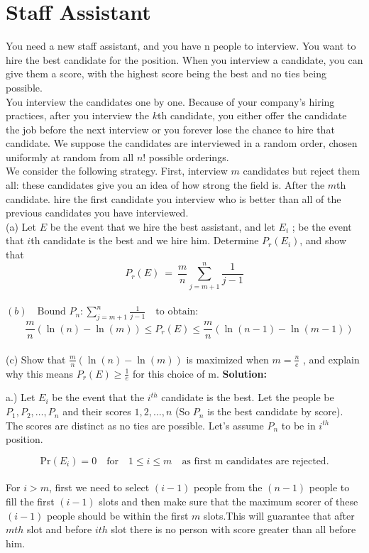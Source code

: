 \documentclass[12pt]{article}
\begin{document}
\newpage

\section{Staff Assistant}
You need a new staff assistant, and you have n people to interview. You want to hire the best
candidate for the position. When you interview a candidate, you can give them a score, with the
highest score being the best and no ties being possible.\\
You interview the candidates one by one. Because of your company’s hiring practices, after
you interview the $k$th candidate, you either offer the candidate the job before the next interview or
you forever lose the chance to hire that candidate. We suppose the candidates are interviewed in
a random order, chosen uniformly at random from all $n!$ possible orderings.\\
We consider the following strategy. First, interview $m$ candidates but reject them all: these
candidates give you an idea of how strong the field is. After the $m$th candidate. hire the first
candidate you interview who is better than all of the previous candidates you have interviewed.\\
(a) Let $E$ be the event that we hire the best assistant, and let $E_i$ ; be the event that $i$th candidate
is the best and we hire him. Determine $P_r(E_i)$, and show that
\begin{equation*}
    P_r(E)\ =\ \frac{m}{n}\sum_{j=m+1}^{n}\frac{1}{j-1}
\end{equation*}
\\
$
(b) \quad \text{Bound } P_n:
\sum_{j=m+1}^{n} \frac{1}{j-1}
\quad \text{to obtain:} $
\begin{equation*}
\quad \frac{m}{n} (\ln(n) - \ln(m)) \leq P_r(E) \leq \frac{m}{n} (\ln(n-1) - \ln(m-1))
\end{equation*}
\\
(c) Show that $\frac{m}{n} (\ln(n) - \ln(m))$ is maximized when $m=\frac{n}{e}$ , and explain why this means $P_r(E) \geq \frac{1}{e}$ for this choice of m.
\newline
\textbf{Solution:}

a.) Let $E_i$ be the event that the $i^{th}$ candidate is the best. Let the people be $P_1, P_2, \ldots, P_n$ and their scores $1, 2, \ldots, n$ (So $P_n$ is the best candidate by score). The scores are distinct as no ties are possible. Let’s assume $P_n$ to be in $i^{th}$ position.

\[
\text{Pr}(E_i) = 0 \quad \text{for} \quad 1 \leq i \leq m \quad \text{as first m candidates are rejected.}
\]
\\
For $i > m$, first we need to select $(i-1)$ people from the $(n-1)$ people to fill the first $(i-1)$ slots and then make sure that the maximum scorer of these $(i-1)$ people should be within the first $m$ slots.This will guarantee that after $mth$ slot and before $ith$ slot there is no person with score greater than all before him.
\end{document}
